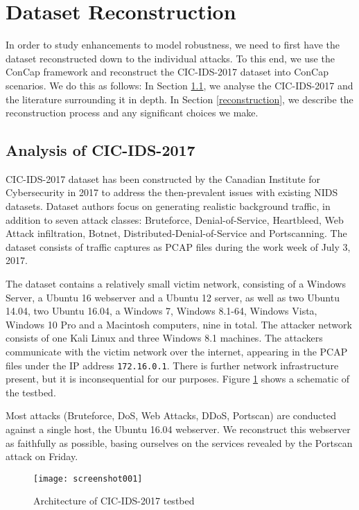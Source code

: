 \section{Dataset Reconstruction}\label{methodology}

In order to study enhancements to model robustness, we need to first have the dataset reconstructed down to the individual attacks. To this end, we use the ConCap framework and reconstruct the CIC-IDS-2017 dataset into ConCap scenarios. We do this as follows: In Section \ref{cic_analysis}, we analyse the CIC-IDS-2017 and the literature surrounding it in depth. In Section \ref{reconstruction}, we describe the reconstruction process and any significant choices we make.

\subsection{Analysis of CIC-IDS-2017}\label{cic_analysis}
CIC-IDS-2017 dataset has been constructed by the Canadian Institute for Cybersecurity in 2017 to address the then-prevalent issues with existing NIDS datasets. Dataset authors focus on generating realistic background traffic, in addition to seven attack classes: Bruteforce, Denial-of-Service, Heartbleed, Web Attack infiltration, Botnet, Distributed-Denial-of-Service and Portscanning. The dataset consists of traffic captures as PCAP files during the work week of July 3, 2017. 

The dataset contains a relatively small victim network, consisting of a Windows Server, a Ubuntu 16 webserver and a Ubuntu 12 server, as well as two Ubuntu 14.04, two Ubuntu 16.04, a Windows 7, Windows 8.1-64, Windows Vista, Windows 10 Pro and a Macintosh computers, nine in total. The attacker network consists of one Kali Linux and three Windows 8.1 machines. The attackers communicate with the victim network over the internet, appearing in the PCAP files under the IP address \texttt{172.16.0.1}. There is further network infrastructure present, but it is inconsequential for our purposes. Figure \ref{fig:cic_2017_testbed} \cite{cic_2017} shows a schematic of the testbed.

Most attacks (Bruteforce, DoS, Web Attacks, DDoS, Portscan) are conducted against a single host, the Ubuntu 16.04 webserver. We reconstruct this webserver as faithfully as possible, basing ourselves on the services revealed by the Portscan attack on Friday.

\begin{figure}
	\centering
	\texttt{[image: screenshot001]}
	\caption{Architecture of CIC-IDS-2017 testbed}
	\label{fig:cic_2017_testbed}
\end{figure}



